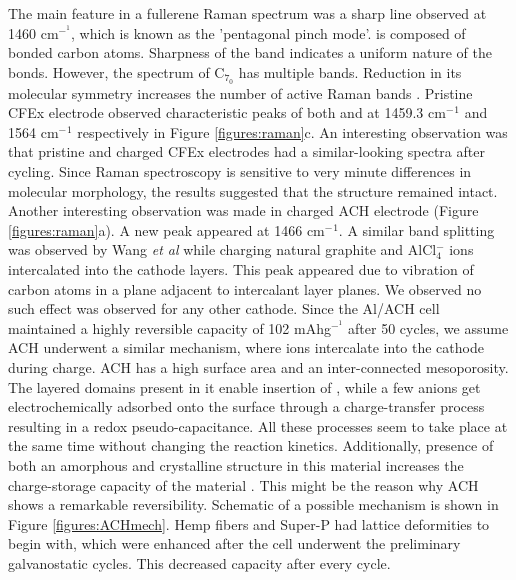 \documentclass{article}
\begin{document}
The main feature in a fullerene Raman spectrum was a sharp line observed at 1460 cm$^-^1$, which is known as the 'pentagonal pinch mode'.  is composed of  bonded carbon atoms. Sharpness of the band indicates a uniform nature of the bonds. However, the spectrum of C$_7_0$ has multiple bands. Reduction in its molecular symmetry increases the number of active Raman bands \cite{kimbrell_analysis_2014}. Pristine CFEx electrode observed characteristic peaks of both  and  at 1459.3 cm$^-{^1}$ and 1564 cm$^-{^1}$ respectively in Figure \ref{figures:raman}c. An interesting observation was that pristine and charged CFEx electrodes had a similar-looking spectra after cycling. Since Raman spectroscopy is sensitive to very minute differences in molecular morphology, the results suggested that the structure remained intact. Another interesting observation was made in charged ACH electrode (Figure \ref{figures:raman}a). A new peak appeared at 1466 cm$^-{^1}$. A similar band splitting was observed by Wang \textit{et al} \cite{wang_kish_2017} while charging natural graphite and AlCl$_4^-$ ions intercalated into the cathode layers. This peak appeared due to vibration of carbon atoms in a plane adjacent to intercalant layer planes. We observed no such effect was observed for any other cathode. Since the Al/ACH cell maintained a highly reversible capacity of 102 mAhg$^-^1$ after 50 cycles, we assume ACH underwent a similar mechanism, where  ions intercalate into the cathode during charge. ACH has a high surface area and an inter-connected mesoporosity. The layered domains present in it enable insertion of , while a few anions get electrochemically adsorbed onto the surface through a charge-transfer process resulting in a redox pseudo-capacitance. All these processes seem to take place at the same time without changing the reaction kinetics. Additionally, presence of both an amorphous and crystalline structure in this material increases the charge-storage capacity of the material \cite{brezesinski_ordered_2010}. This might be the reason why ACH shows a remarkable reversibility. Schematic of a possible mechanism is shown in Figure \ref{figures:ACHmech}. Hemp fibers and Super-P had lattice deformities to begin with, which were enhanced after the cell underwent the preliminary galvanostatic cycles. This decreased capacity after every cycle. 
\end{document}
